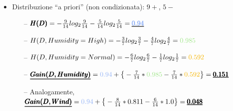 \begin{frame}
\begin{itemize}
\begin{columns}
		\end{columns}
		
		
		
		\item Distribuzione ``a priori'' (non condizionata): $9+$, $5-$
			\begin{itemize}
				\item[--] $\pmb{H(D)} = -\frac{9}{14} log_{2} \frac{9}{14} - \frac{5}{14} log_{2} \frac{5}{14} = \pmb{\underline{{\color{GradientDescentDiagramBlue}0.94}}}$
				\vspace{0.3em}
				\pause
				\item[--] $H(D, Humidity = High) = -\frac{3}{7} log_{2} \frac{3}{7} - \frac{4}{7} log_{2} \frac{4}{7} = {\color{GradientDescentDiagramGreen}0.985}$
				\vspace{0.3em}
				\pause
				\item[--] $H(D, Humidity = Normal) = -\frac{6}{7} log_{2} \frac{6}{7} - \frac{1}{7} log_{2} \frac{1}{7} = {\color{GradientDescentDiagramOrange}0.592}$
				\vspace{0.3em}
				\pause
				\item[--] $\pmb{\underline{Gain(D, Humidity)}} = {\color{GradientDescentDiagramBlue}0.94} + \big\{- \frac{7}{14} * {\color{GradientDescentDiagramGreen}0.985} - \frac{7}{14} * {\color{GradientDescentDiagramOrange}0.592} \big\} = \pmb{\underline{0.151}}$
				\vspace{0.3em}
				\pause
				\item[--] Analogamente,\\
					$\pmb{\underline{Gain(D, Wind)}} = {\color{GradientDescentDiagramBlue}0.94} + \big\{ -\frac{8}{14} * 0.811 - \frac{6}{14} * 1.0 \big\} = \pmb{\underline{0.048}}$
			\end{itemize}
	\end{itemize}
	
\end{frame}


